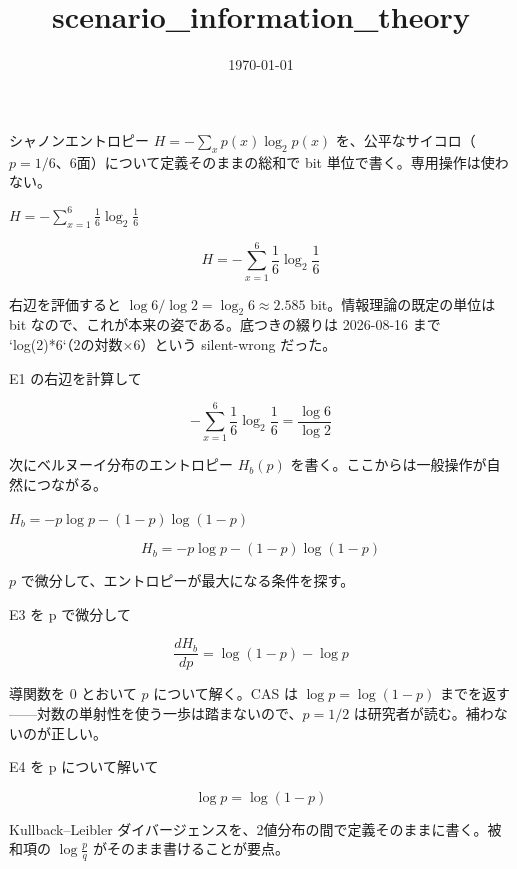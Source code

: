 \documentclass[dvipdfmx,a4paper,11pt]{jsarticle}
\title{scenario\_information\_theory}
\date{\today}
\begin{document}
\maketitle

シャノンエントロピー $H=-\sum_x p(x)\log_2 p(x)$ を、公平なサイコロ（$p=1/6$、6面）について定義そのままの総和で bit 単位で書く。専用操作は使わない。

$H = -\sum_{x=1}^{6} \frac{1}{6}\log_2 \frac{1}{6}$

\begin{equation}
  H = -\sum_{x=1}^{6} \frac{1}{6}\log_2 \frac{1}{6}
  \label{eq:E1}
\end{equation}

右辺を評価すると $\log 6/\log 2 = \log_2 6 \approx 2.585$ bit。情報理論の既定の単位は bit なので、これが本来の姿である。底つきの綴りは 2026-08-16 まで `log(2)*6`（2の対数$\times$6）という silent-wrong だった。

E1 の右辺を計算して

\begin{equation}
  -\sum_{x=1}^{6} \frac{1}{6}\log_2 \frac{1}{6} = \frac{\log 6}{\log 2}
  \label{eq:E2}
\end{equation}

次にベルヌーイ分布のエントロピー $H_b(p)$ を書く。ここからは一般操作が自然につながる。

$H_b = -p\log p - (1-p)\log(1-p)$

\begin{equation}
  H_b = -p\log p - (1-p)\log(1-p)
  \label{eq:E3}
\end{equation}

$p$ で微分して、エントロピーが最大になる条件を探す。

E3 を p で微分して

\begin{equation}
  \frac{dH_b}{dp} = \log \left(1-p\right)-\log p
  \label{eq:E4}
\end{equation}

導関数を 0 とおいて $p$ について解く。CAS は $\log p=\log(1-p)$ までを返す——対数の単射性を使う一歩は踏まないので、$p=1/2$ は研究者が読む。補わないのが正しい。

E4 を p について解いて

\begin{equation}
  \log p = \log \left(1-p\right)
  \label{eq:E5}
\end{equation}

Kullback–Leibler ダイバージェンスを、2値分布の間で定義そのままに書く。被和項の $\log\frac{p}{q}$ がそのまま書けることが要点。
\end{document}

